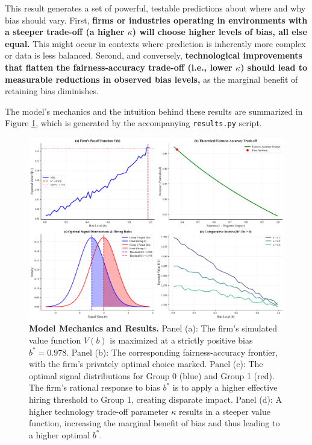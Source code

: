\documentclass[12pt,a4paper]{article}
\theoremstyle{definition}
\theoremstyle{remark}
\begin{document}
This result generates a set of powerful, testable predictions about where and why bias should vary. 
First, \textbf{firms or industries operating in environments with a steeper trade-off (a higher $\kappa$) will choose higher levels of bias, all else equal.} This might occur in contexts where prediction is inherently more complex or data is less balanced.
Second, and conversely, \textbf{technological improvements that flatten the fairness-accuracy trade-off (i.e., lower $\kappa$) should lead to measurable reductions in observed bias levels,} as the marginal benefit of retaining bias diminishes.

The model's mechanics and the intuition behind these results are summarized in Figure \ref{fig:main_results}, which is generated by the accompanying \texttt{results.py} script.

\begin{figure}[H]
    \centering
    \includegraphics[width=\textwidth]{../figures/figure_1_model_mechanics.png}
    \caption[Model Mechanics and Results]{\textbf{Model Mechanics and Results.} 
    Panel (a): The firm's simulated value function $V(b)$ is maximized at a strictly positive bias $b^*=0.978$. 
    Panel (b): The corresponding fairness-accuracy frontier, with the firm's privately optimal choice marked. 
    Panel (c): The optimal signal distributions for Group 0 (blue) and Group 1 (red). The firm's rational response to bias $b^*$ is to apply a higher effective hiring threshold to Group 1, creating disparate impact.
    Panel (d): A higher technology trade-off parameter $\kappa$ results in a steeper value function, increasing the marginal benefit of bias and thus leading to a higher optimal $b^*$.}
    \label{fig:main_results}
\end{figure}
\end{document}
